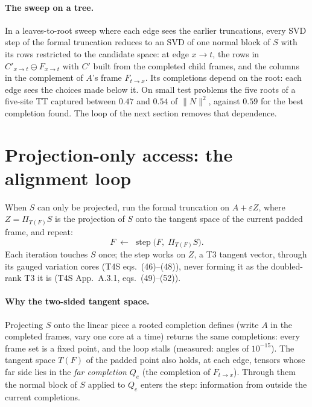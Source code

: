 \documentclass[11pt]{article}
\newcommand{\eps}{\varepsilon}
\theoremstyle{definition}
\theoremstyle{plain}
\begin{document}
\paragraph{The sweep on a tree.} In a leaves-to-root sweep where each edge sees the earlier truncations, every SVD
step of the formal truncation reduces to an SVD of one normal block of $S$ with its rows restricted to the candidate
space: at edge $x\to t$, the rows in $C'_{x\to t}\ominus F_{x\to t}$ with $C'$ built from the completed child frames,
and the columns in the complement of $A$'s frame $F_{t\to x}$. Its completions depend on the root: each edge sees the
choices made below it. On small test problems the five roots of a five-site TT captured between $0.47$ and $0.54$ of
$\|N\|^2$, against $0.59$ for the best completion found. The loop of the next section removes that dependence.

\section{Projection-only access: the alignment loop}\label{sec:loop}

When $S$ can only be projected, run the formal truncation on $A+\eps Z$, where $Z=\Pi_{T(F)}S$ is the projection of
$S$ onto the tangent space of the current padded frame, and repeat:
\begin{equation}\label{eq:loop}
  F \;\leftarrow\; \operatorname{step}\bigl(F,\;\Pi_{T(F)}S\bigr).
\end{equation}
Each iteration touches $S$ once; the step works on $Z$, a T3 tangent vector, through its gauged variation cores (T4S
eqs.~(46)--(48)), never forming it as the doubled-rank T3 it is (T4S App.~A.3.1, eqs.~(49)--(52)).

\paragraph{Why the two-sided tangent space.} Projecting $S$ onto the linear piece a rooted completion defines (write
$A$ in the completed frames, vary one core at a time) returns the same completions: every frame set is a fixed point,
and the loop stalls (measured: angles of $10^{-15}$). The tangent space $T(F)$ of the padded point also holds, at each
edge, tensors whose far side lies in the \emph{far completion} $Q_e$ (the completion of $F_{t\to x}$). Through them
the normal block of $S$ applied to $Q_e$ enters the step: information from outside the current completions.
\end{document}
